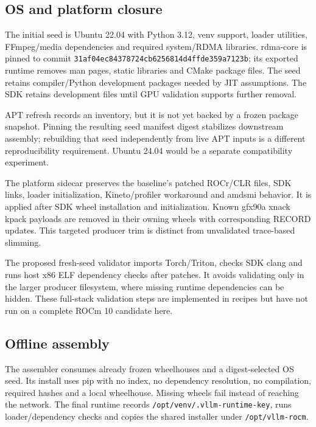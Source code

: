 \documentclass[11pt,a4paper]{article}
\newcommand{\file}[1]{\nolinkurl{#1}}
\begin{document}
\subsection{OS and platform closure}

The initial seed is Ubuntu 22.04 with Python 3.12, venv support, loader utilities,
FFmpeg/media dependencies and required system/RDMA libraries. rdma-core is pinned
to commit \file{31af04ec84378724cb6256814d4ffde359a7123b}; its exported runtime
removes man pages, static libraries and CMake package files. The seed retains
compiler/Python development packages needed by JIT assumptions. The SDK retains
development files until GPU validation supports further removal.

APT refresh records an inventory, but it is not yet backed by a frozen package
snapshot. Pinning the resulting seed manifest digest stabilizes downstream
assembly; rebuilding that seed independently from live APT inputs is a different
reproducibility requirement. Ubuntu 24.04 would be a separate compatibility
experiment.

The platform sidecar preserves the baseline's patched ROCr/CLR files, SDK links,
loader initialization, Kineto/profiler workaround and amdsmi behavior. It is
applied after SDK wheel installation and initialization. Known gfx90a xnack
kpack payloads are removed in their owning wheels with corresponding RECORD
updates. This targeted producer trim is distinct from unvalidated trace-based
slimming.

The proposed fresh-seed validator imports Torch/Triton, checks SDK clang and
runs host x86 ELF dependency checks after patches. It avoids validating only in
the larger producer filesystem, where missing runtime dependencies can be hidden.
These full-stack validation steps are implemented in recipes but have not run
on a complete ROCm 10 candidate here.

\subsection{Offline assembly}

The assembler consumes already frozen wheelhouses and a digest-selected OS seed.
Its install uses pip with no index, no dependency resolution, no compilation,
required hashes and a local wheelhouse. Missing wheels fail instead of reaching
the network. The final runtime records \file{/opt/venv/.vllm-runtime-key},
runs loader/dependency checks and copies the shared installer under
\file{/opt/vllm-rocm}.
\end{document}
